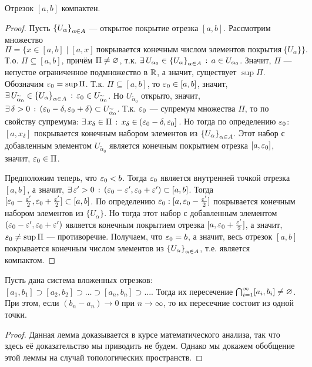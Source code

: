 \begin{theorem}
    Отрезок $[a, b]$ компактен.
\end{theorem}
\begin{proof}
    Пусть $\left\{U_{\alpha}\right\}_{\alpha \in A}$ --- открытое покрытие отрезка $[a, b]$. 
    Рассмотрим множество 
    \[
        \Pi = \{x \in [a, b] \mid [a, x] \ \text{покрывается конечным числом элементов покрытия} \ \{ U_{\alpha} \}\}.
    \]
    Т.о. $\Pi \subseteq [a, b]$, причём $\Pi \neq \varnothing$, т.к. $\exists \, U_{\alpha_0} \in \left\{U_{\alpha}\right\}_{\alpha \in A} \, : \, a \in U_{\alpha_0}$. Значит, $\Pi$ --- непустое ограниченное подмножество в $\mathbb{R}$, а значит, существует $\sup\Pi$.  
    Обозначим $\varepsilon_0 = \sup\Pi$. Т.к. $\Pi \subseteq [a, b]$, то $\varepsilon_0 \in [a, b]$, значит, $\exists \, U_{\widetilde{\alpha}_0} \in \left\{U_{\alpha}\right\}_{\alpha \in A} \, : \, \varepsilon_0 \in U_{\widetilde{\alpha}_0}$.
    Но $U_{\widetilde{\alpha}_0}$ открыто, значит, $\exists \, \delta > 0 \, : \, (\varepsilon_0 - \delta, \varepsilon_0 + \delta) \subset U_{\widetilde{\alpha}_0}$.
    Т.к. $\varepsilon_0$ --- супремум множества $\Pi$, то по свойству супремума: $\exists \, x_{\delta} \in \Pi \, : \, x_{\delta} \in \!\left.\left(\varepsilon_0 - \delta, \varepsilon_0\right]\right.$. Но тогда по определению $\varepsilon_0$:
    $[a, x_{\delta}]$ покрывается конечным набором элементов из $\left\{U_{\alpha}\right\}_{\alpha \in A}$. Этот набор с добавленным элементом $U_{\widetilde{\alpha}_0}$ является конечным покрытием отрезка $[a, \varepsilon_0]$, значит, $\varepsilon_0 \in \Pi$.

    Предположим теперь, что $\varepsilon_0 < b$. Тогда $\varepsilon_0$ является внутренней точкой отрезка $[a, b]$, а значит, $\exists \, \varepsilon' > 0 \, : \, (\varepsilon_0 - \varepsilon', \varepsilon_0 + \varepsilon') \subset [a, b]$.
    Тогда $[\varepsilon_0 - \frac{\varepsilon'}{2}, \varepsilon_0 + \frac{\varepsilon'}{2}] \subset [a, b]$. По определению $\varepsilon_0: [a, \varepsilon_0 - \frac{\varepsilon'}{2}]$ покрывается конечным набором элементов из $\{ U_{\alpha} \}$.
    Но тогда этот набор с добавленным элементом $(\varepsilon_0 - \varepsilon', \varepsilon_0 + \varepsilon')$ является конечным покрытием отрезка $[a, \varepsilon_0 + \frac{\varepsilon'}{2}]$, а значит, $\varepsilon_0 \neq \sup\Pi$ --- противоречие. 
    Получаем, что $\varepsilon_0 = b$, а значит, весь отрезок $[a, b]$ покрывается конечным числом элементов из $\left\{U_{\alpha}\right\}_{\alpha \in A}$, т.е. является компактом.
\end{proof}

\begin{lemma}
    Пусть дана система вложенных отрезков: $[a_1, b_1] \supset [a_2, b_2] \supset \ldots \supset [a_n, b_n] \supset ...$.
    Тогда их пересечение $\bigcap_{i = 1}^{\infty} [a_i, b_i] \neq \varnothing$. При этом, если $(b_n - a_n) \to 0$ при $n \to \infty$, то их пересечние состоит из одной точки.
\end{lemma}
\begin{proof}
    Данная лемма доказывается в курсе математического анализа, так что здесь её доказательство мы приводить не будем. Однако мы докажем обобщение этой леммы на случай топологических пространств.
\end{proof}

